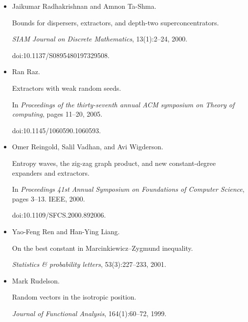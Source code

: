 \documentclass[10pt,a4paper]{article}
\begin{document}
\begin{itemize}
doi:10.1006/JCSS.1996.0004.





\item[] 
[29]

Jaikumar Radhakrishnan and Amnon Ta-Shma.


Bounds for dispersers, extractors, and depth-two superconcentrators.


\emph{SIAM Journal on Discrete Mathematics}, 13(1):2–24, 2000.


doi:10.1137/S0895480197329508.





\item[] 
[30]

Ran Raz.


Extractors with weak random seeds.


In \emph{Proceedings of the thirty-seventh annual ACM symposium on
Theory of computing}, pages 11–20, 2005.


doi:10.1145/1060590.1060593.





\item[] 
[31]

Omer Reingold, Salil Vadhan, and Avi Wigderson.


Entropy waves, the zig-zag graph product, and new constant-degree
expanders and extractors.


In \emph{Proceedings 41st Annual Symposium on Foundations of Computer
Science}, pages 3–13. IEEE, 2000.


doi:10.1109/SFCS.2000.892006.





\item[] 
[32]

Yao-Feng Ren and Han-Ying Liang.


On the best constant in Marcinkiewicz–Zygmund inequality.


\emph{Statistics \& probability letters}, 53(3):227–233, 2001.





\item[] 
[33]

Mark Rudelson.


Random vectors in the isotropic position.


\emph{Journal of Functional Analysis}, 164(1):60–72, 1999.






\end{itemize}
\end{document}
